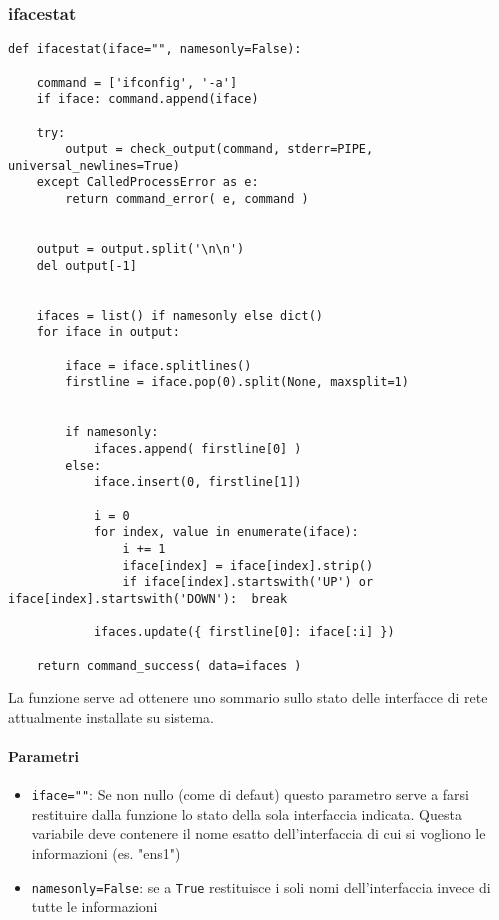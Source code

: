 \documentclass[11pt]{article}
\begin{document}
\subsubsection{ifacestat}\label{ifacestat}
\begin{lstlisting}
def ifacestat(iface="", namesonly=False):

    command = ['ifconfig', '-a']
    if iface: command.append(iface)

    try:
        output = check_output(command, stderr=PIPE, universal_newlines=True)
    except CalledProcessError as e:
        return command_error( e, command )


    output = output.split('\n\n')
    del output[-1]


    ifaces = list() if namesonly else dict()
    for iface in output:

        iface = iface.splitlines()
        firstline = iface.pop(0).split(None, maxsplit=1)


        if namesonly:
            ifaces.append( firstline[0] )
        else:
            iface.insert(0, firstline[1])

            i = 0
            for index, value in enumerate(iface):
                i += 1
                iface[index] = iface[index].strip()
                if iface[index].startswith('UP') or iface[index].startswith('DOWN'):  break

            ifaces.update({ firstline[0]: iface[:i] })

    return command_success( data=ifaces )
\end{lstlisting}
La funzione serve ad ottenere uno sommario sullo stato delle interfacce di rete attualmente installate su sistema.
\paragraph{Parametri}
\begin{itemize}
	\item{\texttt{iface=""}: Se non nullo (come di defaut) questo parametro serve a farsi restituire dalla funzione
		lo stato della sola interfaccia indicata. Questa variabile deve contenere il nome esatto dell'interfaccia
		di cui si vogliono le informazioni (es. "ens1")}
	\item{\texttt{namesonly=False}: se a \texttt{True} restituisce i soli nomi dell'interfaccia
		invece di tutte le informazioni}
\end{itemize}
\end{document}
